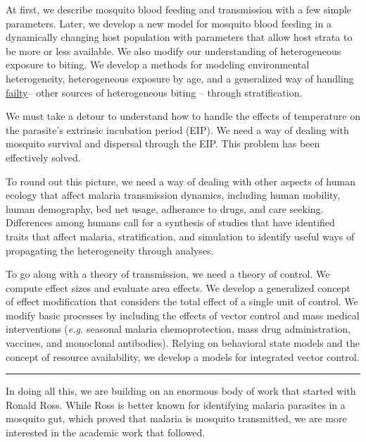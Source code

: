 \documentclass[
]{book}
\begin{document}
At first, we describe mosquito blood feeding and transmission with a few simple parameters. Later, we develop a new model for mosquito blood feeding in a dynamically changing host population with parameters that allow host strata to be more or less available. We also modify our understanding of heterogeneous exposure to biting. We develop a methods for modeling environmental heterogeneity, heterogeneous exposure by age, and a generalized way of handling \href{Frailty}{failty}-- other sources of heterogeneous biting -- through stratification.

We must take a detour to understand how to handle the effects of temperature on the parasite's extrinsic incubation period (EIP). We need a way of dealing with mosquito survival and dispersal through the EIP. This problem has been effectively solved.

To round out this picture, we need a way of dealing with other aspects of human ecology that affect malaria transmission dynamics, including human mobility, human demography, bed net usage, adherance to drugs, and care seeking. Differences among humans call for a synthesis of studies that have identified traits that affect malaria, stratification, and simulation to identify useful ways of propagating the heterogeneity through analyses.

To go along with a theory of transmission, we need a theory of control. We compute effect sizes and evaluate area effects. We develop a generalized concept of effect modification that considers the total effect of a single unit of control. We modify basic processes by including the effects of vector control and mass medical interventions (\emph{e.g.} seasonal malaria chemoprotection, mass drug administration, vaccines, and monoclonal antibodies). Relying on behavioral state models and the concept of resource availability, we develop a models for integrated vector control.

\begin{center}\rule{0.5\linewidth}{0.5pt}\end{center}

In doing all this, we are building on an enormous body of work that started with Ronald Ross. While Ross is better known for identifying malaria parasites in a mosquito gut, which proved that malaria is mosquito transmitted, we are more interested in the academic work that followed.
\end{document}
